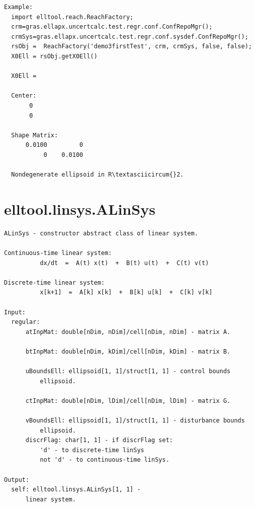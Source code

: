 \documentclass[letterpaper,10pt,english]{sphinxmanual}
\begin{document}
\begin{Verbatim}[commandchars=\\\{\}]
Example:
  import elltool.reach.ReachFactory;
  crm=gras.ellapx.uncertcalc.test.regr.conf.ConfRepoMgr();
  crmSys=gras.ellapx.uncertcalc.test.regr.conf.sysdef.ConfRepoMgr();
  rsObj =  ReachFactory('demo3firstTest', crm, crmSys, false, false);
  X0Ell = rsObj.getX0Ell()

  X0Ell =

  Center:
       0
       0

  Shape Matrix:
      0.0100         0
           0    0.0100

  Nondegenerate ellipsoid in R\textasciicircum{}2.
\end{Verbatim}


\section{elltool.linsys.ALinSys}
\label{chap_func:elltool-linsys-alinsys}
\begin{Verbatim}[commandchars=\\\{\}]
ALinSys - constructor abstract class of linear system.

Continuous-time linear system:
          dx/dt  =  A(t) x(t)  +  B(t) u(t)  +  C(t) v(t)

Discrete-time linear system:
          x[k+1]  =  A[k] x[k]  +  B[k] u[k]  +  C[k] v[k]

Input:
  regular:
      atInpMat: double[nDim, nDim]/cell[nDim, nDim] - matrix A.

      btInpMat: double[nDim, kDim]/cell[nDim, kDim] - matrix B.

      uBoundsEll: ellipsoid[1, 1]/struct[1, 1] - control bounds
          ellipsoid.

      ctInpMat: double[nDim, lDim]/cell[nDim, lDim] - matrix G.

      vBoundsEll: ellipsoid[1, 1]/struct[1, 1] - disturbance bounds
          ellipsoid.
      discrFlag: char[1, 1] - if discrFlag set:
          'd' - to discrete-time linSys
          not 'd' - to continuous-time linSys.

Output:
  self: elltool.linsys.ALinSys[1, 1] -
      linear system.
\end{Verbatim}
\end{document}
